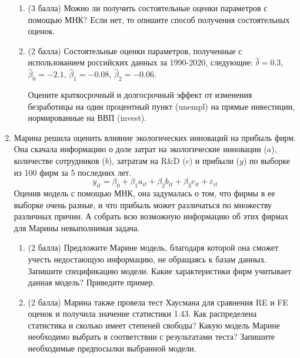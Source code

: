 \begin{enumerate}
 \begin{enumerate}
\item 	(3 балла) Можно ли получить состоятельные оценки параметров с помощью МНК? Если нет, то опишите способ получения состоятельных оценок.
\item (2 балла) 
Состоятельные оценки параметров, полученные с использованием российских данных за 1990-2020, следующие: 
$\hat\delta = 0.3$,
$\hat\beta_0 = -2.1$,
$\hat\beta_1 = -0.08$, $\hat \beta_2 = -0.06$.

Оцените краткосрочный и долгосрочный эффект от изменения безработицы на один процентный пункт (unempl) на прямые инвестиции, нормированные на ВВП (invest). 


\end{enumerate}



\item %

Марина решила оценить влияние экологических инноваций на прибыль фирм. Она скачала информацию о доле затрат на экологические инновации ($a$), количестве сотрудников ($b$), затратам на R\&D ($c$)  и прибыли ($y$) по выборке из 100 фирм за 5 последних лет. 
\[ 
y_{it} = \beta_0 + \beta_1 a_{it} +  \beta_2 b_{it} + \beta_3 c_{it} + \varepsilon_{it}
\]
Оценив модель с помощью МНК, она задумалась о том, что фирмы в ее выборке очень разные, и что прибыль может различаться по множеству различных причин. 
А собрать всю возможную информацию об этих фирмах для Марины невыполнимая задача.
\begin{enumerate}
    \item (2 балла) Предложите Марине модель, благодаря которой она сможет учесть недостающую информацию, не обращаясь к базам данных. Запишите спецификацию модели. Какие характеристики фирм учитывает данная модель? Приведите пример. 

    \item (2 балла) Марина также провела тест Хаусмана для сравнения RE и FE оценок и получила значение статистики 1.43.  
    Как распределена статистика и сколько имеет степеней свободы? 
    Какую модель Марине необходимо выбрать в соответствии с результатами теста?
    Запишите необходимые предпосылки выбранной модели.
\end{enumerate}




\end{enumerate}

